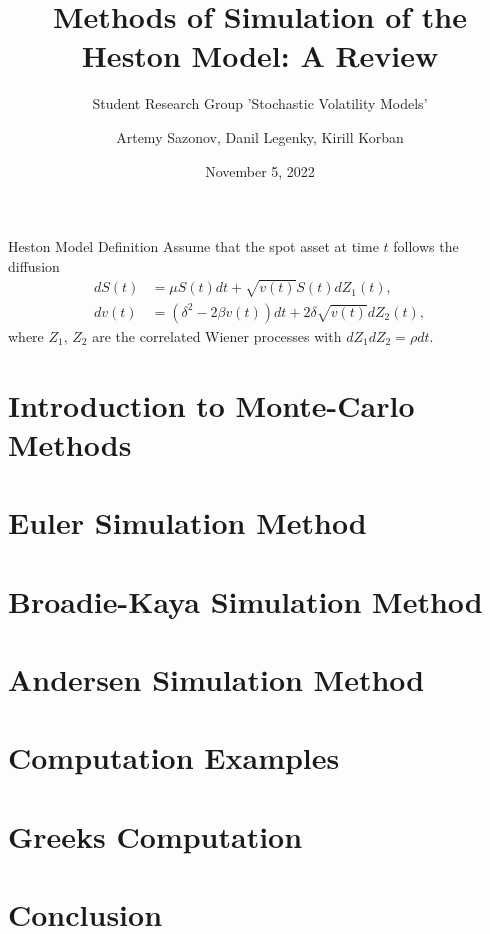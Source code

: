 \documentclass{vegapresentation}
\subtitle{Student Research Group 'Stochastic Volatility Models'}
\title{Methods of Simulation of the Heston Model: A Review}
\author{Artemy Sazonov, Danil Legenky, Kirill Korban}
\institute{Lomonosov Moscow State Univesity, Faculty of Mechanics and Mathematics}
\date{November 5, 2022}
\begin{document}
    \maketitle

    \begin{frame}{Heston Model Definition}
        Assume that the spot asset at time $t$ follows the diffusion
        \begin{align}
            dS(t) & = \mu S(t)dt + \sqrt{v(t)} S(t) dZ_1(t), \label{Heston:price}\\
            dv(t) & = \left(\delta^2 - 2\beta v(t)\right) dt + 2\delta \sqrt{v(t)} dZ_2(t), \label{Heston:variance}
        \end{align}
        where $Z_1$, $Z_2$ are the correlated Wiener processes with $dZ_1dZ_2 = \rho dt$.
    \end{frame}

    \section{Introduction to Monte-Carlo Methods}
        

    \section{Euler Simulation Method}
        

    \section{Broadie-Kaya Simulation Method} 
        

    \section{Andersen Simulation Method}
        

    \section{Computation Examples}
        

    \section{Greeks Computation}
        
    
    \section{Conclusion}
\end{document}
